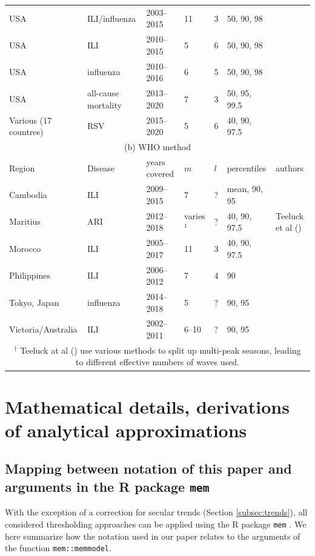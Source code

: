 \documentclass[12pt]{article}
\begin{document}
\begin{table}[h!]
\begin{tabular}{l l l l l l l}
USA & ILI/influenza & 2003--2015 & 11 & 3 & 50, 90, 98 & \cite{Biggerstaff2017}\\
USA & ILI & 2010--2015 & 5 & 6 & 50, 90, 98 & \cite{Dahlgren2018}\\
USA & influenza & 2010--2016 & 6 & 5 & 50, 90, 98 & \cite{Dahlgren2019}\\
USA & all-cause mortality & 2013--2020 & 7 & 3 & 50, 95, 99.5 & \cite{Dahlgren2022}\\
Various (17 countres) & RSV & 2015--2020 & 5 & 6 & 40, 90, 97.5 & \cite{Wang2023} \\ %
\midrule 
\multicolumn{7}{c}{(b) WHO method}\\
\toprule
Region & Disease & years covered & $m$ & $l$ & percentiles & authors\\
\midrule
Cambodia & ILI & 2009--2015 & 7 & ? & mean, 90, 95 & \cite{Ly2017}\\
Maritius & ARI & 2012--2018 & varies$^1$ & ? & 40, 90, 97.5 & Teeluck et al (\citeyear{Teeluck2021}) \\
Morocco & ILI & 2005--2017 & 11 & 3 & 40, 90, 97.5 & \cite{Rguig2020}\\
Philippines & ILI & 2006--2012 & 7 & 4 & 90 & \cite{Lucero2016}\\
Tokyo, Japan & influenza & 2014--2018 & 5 & ? & 90, 95 & \cite{Matsuda2022} \\
Victoria/Australia & ILI & 2002--2011 & 6--10 & ? & 90, 95 & \cite{Tay2013}\\
\bottomrule
\multicolumn{7}{c}{$^\dagger$ Teeluck at al (\citeyear{Teeluck2021}) use various methods to split up multi-peak seasons, leading to different effective numbers of waves used.}\\ 
\end{tabular}
\end{table}

\newpage


\section{Mathematical details, derivations of analytical approximations}
\label{appendix:derivations}

\subsection{Mapping  between notation of this paper and arguments in the R package \texttt{mem}}
\label{suppl:mapping}

With the exception of a correction for secular trends (Section \ref{subsec:trends}), all considered thresholding approaches can be applied using the R package \texttt{mem} \citep{Lozano2020}. We here summarize how the notation used in our paper relates to the arguments of the function \texttt{mem::memmodel}.
\end{document}
